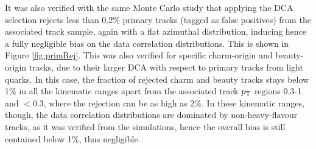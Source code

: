 It was also verified with the same Monte Carlo study that applying the DCA selection rejects less than 0.2\% primary tracks (tagged as false positives) from the associated track sample, again with a flat azimuthal distribution, inducing hence a fully negligible bias on the data correlation distributions. This is shown in Figure \ref{fig:primRej}. This was also verified for specific charm-origin and beauty-origin tracks, due to their larger DCA with respect to primary tracks from light quarks. In this case, the fraction of rejected charm and beauty tracks stays below 1\% in all the kinematic ranges apart from the associated track $p_{\rm T}$ regions 0.3-1 and $<0.3$, where the rejection can be as high as 2\%. In these kinematic ranges, though, the data correlation distributions are dominated by non-heavy-flavour tracks, as it was verified from the simulations, hence the overall bias is still contained below 1\%, thus negligible.

